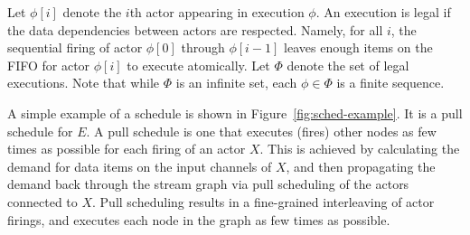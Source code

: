 


Let $\phi[i]$ denote the $i$th actor appearing in execution $\phi$.
An execution is legal if the data dependencies between actors are
respected. Namely, for all $i$, the sequential firing of actor
$\phi[0]$ through $\phi[i-1]$ leaves enough items on the FIFO for
actor $\phi[i]$ to execute atomically. Let $\Phi$ denote the set of
legal executions. Note that while $\Phi$ is an infinite set, each
$\phi \in \Phi$ is a finite sequence.

\begin{figure*}[t]
\begin{center}
\vspace{-12pt}
\vspace{-4pt}
\caption{\small The stream graphs illustrate a steady
state cycle of a ``pull schedule''; execution proceeds from left to
right, and channels are annotated with the number of items present.
The second line lists the actors that fire in a pull schedule for
$E$.
\protect\label{fig:sched-example}}
\end{center}
\vspace{-12pt}
\end{figure*}

A simple example of a schedule is shown in
Figure~\ref{fig:sched-example}. It is a pull schedule for $E$. A pull
schedule is one that executes (fires) other nodes as few times as
possible for each firing of an actor $X$. This is achieved by
calculating the demand for data items on the input channels of $X$,
and then propagating the demand back through the stream graph via pull
scheduling of the actors connected to $X$. Pull scheduling results in
a fine-grained interleaving of actor firings, and executes each node
in the graph as few times as possible.

